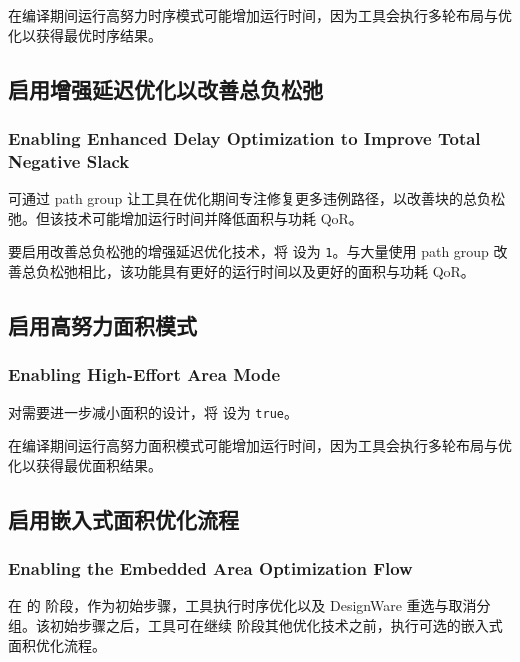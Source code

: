 在编译期间运行高努力时序模式可能增加运行时间，因为工具会执行多轮布局与优化以获得最优时序结果。

\subsection{启用增强延迟优化以改善总负松弛}
\subsubsection*{Enabling Enhanced Delay Optimization to Improve Total Negative Slack}

可通过 path group 让工具在优化期间专注修复更多违例路径，以改善块的总负松弛。但该技术可能增加运行时间并降低面积与功耗 QoR。

要启用改善总负松弛的增强延迟优化技术，将  设为 \texttt{1}。与大量使用 path group 改善总负松弛相比，该功能具有更好的运行时间以及更好的面积与功耗 QoR。

\subsection{启用高努力面积模式}
\subsubsection*{Enabling High-Effort Area Mode}

对需要进一步减小面积的设计，将  设为 \texttt{true}。

在编译期间运行高努力面积模式可能增加运行时间，因为工具会执行多轮布局与优化以获得最优面积结果。

\subsection{启用嵌入式面积优化流程}
\subsubsection*{Enabling the Embedded Area Optimization Flow}

在  的  阶段，作为初始步骤，工具执行时序优化以及 DesignWare 重选与取消分组。该初始步骤之后，工具可在继续  阶段其他优化技术之前，执行可选的嵌入式面积优化流程。

